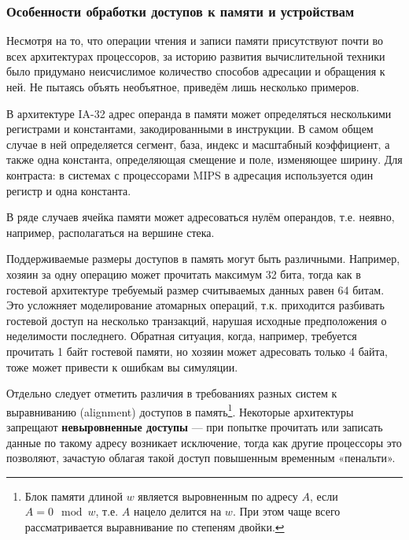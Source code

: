 \subsubsection{Особенности обработки доступов к памяти и устройствам}

Несмотря на то, что операции чтения и записи памяти присутствуют почти во всех архитектурах процессоров, за историю развития вычислительной техники было придумано неисчислимое количество способов адресации и обращения к ней. Не пытаясь объять необъятное, приведём лишь несколько примеров.

\begin{itemize*}

\item В архитектуре IA-32 адрес операнда в памяти может определяться несколькими регистрами и константами, закодированными в инструкции. В самом общем случае в ней определяется сегмент, база, индекс и масштабный коэффициент, а также одна константа, определяющая смещение и поле, изменяющее ширину. Для контраста: в системах с процессорами MIPS в адресация используется один регистр и одна константа.

\item В ряде случаев ячейка памяти может адресоваться нулём операндов, т.е. неявно, например, располагаться на вершине стека.

\item Поддерживаемые размеры доступов в память могут быть различными. Например, хозяин за одну операцию может прочитать максимум 32 бита, тогда как в гостевой архитектуре требуемый размер считываемых данных равен 64 битам. Это усложняет моделирование атомарных операций, т.к. приходится разбивать гостевой доступ на несколько транзакций, нарушая исходные предположения о неделимости последнего. Обратная ситуация, когда, например, требуется прочитать 1 байт гостевой памяти, но хозяин может адресовать только 4 байта, тоже может привести к ошибкам вы симуляции.

\item Отдельно следует отметить различия в требованиях разных систем к выравниванию (\abbr alignment) доступов в память\footnote{Блок памяти длиной $w$ является выровненным по адресу $A$, если $A = 0 \mod w$, т.е. $A$ нацело делится на $w$. При этом чаще всего рассматривается выравнивание по степеням двойки.}. Некоторые архитектуры запрещают \textbf{невыровненные доступы} --- при попытке прочитать или записать данные по такому адресу возникает исключение, тогда как другие процессоры это позволяют, зачастую облагая такой доступ повышенным временным «пенальти».
\end{itemize*}

